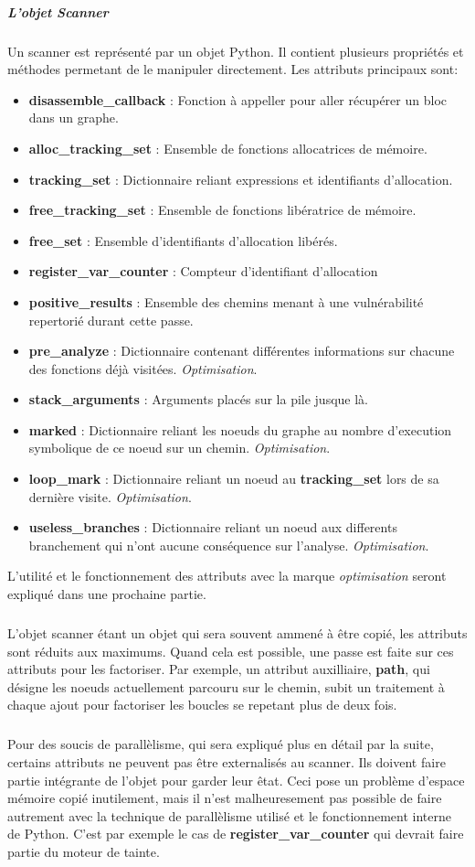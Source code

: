 \subparagraph{L'objet Scanner}
Un scanner est représenté par un objet Python. Il contient plusieurs propriétés et méthodes permetant de le manipuler directement.
Les attributs principaux sont:
\begin{itemize}
    \item \textbf{disassemble\_callback} : Fonction à appeller pour aller récupérer un bloc dans un graphe.
    \item \textbf{alloc\_tracking\_set} : Ensemble de fonctions allocatrices de mémoire.
    \item \textbf{tracking\_set} : Dictionnaire reliant expressions et identifiants d'allocation.
    \item \textbf{free\_tracking\_set} : Ensemble de fonctions libératrice de mémoire.
    \item \textbf{free\_set} : Ensemble d'identifiants d'allocation libérés.
    \item \textbf{register\_var\_counter} : Compteur d'identifiant d'allocation
    \item \textbf{positive\_results} : Ensemble des chemins menant à une vulnérabilité repertorié durant cette passe.
    \item \textbf{pre\_analyze} : Dictionnaire contenant différentes informations sur chacune des fonctions déjà visitées. \textit{Optimisation}.
    \item \textbf{stack\_arguments} : Arguments placés sur la pile jusque là.
    \item \textbf{marked} : Dictionnaire reliant les noeuds du graphe au nombre d'execution symbolique de ce noeud sur un chemin. \textit{Optimisation}.
    \item \textbf{loop\_mark} : Dictionnaire reliant un noeud au \textbf{tracking\_set} lors de sa dernière visite. \textit{Optimisation}.
    \item \textbf{useless\_branches} : Dictionnaire reliant un noeud aux differents branchement qui n'ont aucune conséquence sur l'analyse. \textit{Optimisation}.
\end{itemize}
L'utilité et le fonctionnement des attributs avec la marque \textit{optimisation} seront expliqué dans une prochaine partie.
\subparagraph{}
L'objet scanner étant un objet qui sera souvent ammené à être copié, les attributs sont réduits aux maximums. Quand cela est possible, une passe est faite sur
ces attributs pour les factoriser. Par exemple, un attribut auxilliaire, \textbf{path}, qui désigne les noeuds actuellement parcouru sur le chemin, subit un traitement
à chaque ajout pour factoriser les boucles se repetant plus de deux fois.
\subparagraph{}
Pour des soucis de parallèlisme, qui sera expliqué plus en détail par la suite, certains attributs ne peuvent pas être externalisés au scanner. Ils doivent faire partie
intégrante de l'objet pour garder leur êtat. Ceci pose un problème d'espace mémoire copié inutilement, mais il n'est malheuresement pas possible de faire autrement avec
la technique de parallèlisme utilisé et le fonctionnement interne de Python. C'est par exemple le cas de \textbf{register\_var\_counter} qui devrait faire partie du moteur de tainte.

